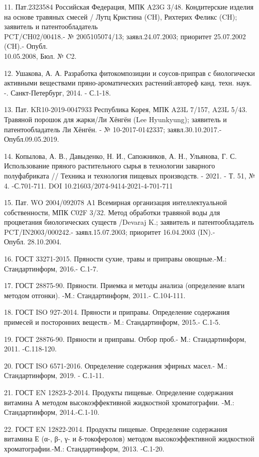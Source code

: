 \begin{references}
11. Пат.2323584 Российская Федерация, МПК A23G 3/48. Кондитерские
изделия на основе травяных смесей / Лутц Кристина (CH), Рихтерих Феликс
(CH); заявитель и патентообладатель \\PCT/CH02/00418.- № 2005105074/13;
заявл.24.07.2003; приоритет 25.07.2002 (CH).- Опубл. \\10.05.2008, Бюл. №
C2.

12. Ушакова, А. А. Разработка фитокомпозиции и соусов-приправ с
биологически активными веществами пряно-ароматических растений:автореф
канд. техн. наук. -. Санкт-Петербург, 2014. - С.1-18.

13. Пат. KR10-2019-0047933 Республика Корея, МПК A23L 7/157, A23L 5/43.
Травяной порошок для жарки/Ли Хёнгён (Lee Hyunkyung); заявитель и
патентообладатель Ли Хёнгён. - № 10-2017-0142337; заявл.30.10.2017.-
Опубл.09.05.2019.

14. Копылова, А. В., Давыденко, Н. И., Сапожников, А. Н., Ульянова, Г. С.
Использование пряного растительного сырья в технологии заварного
полуфабриката // Техника и технология пищевых производств. - 2021. - Т.
51, № 4. -С.701-711. DOI 10.21603/2074-9414-2021-4-701-711

15. Пат. WO 2004/092078 A1 Всемирная организация интеллектуальной
собственности, МПК C02F 3/32. Метод обработки травяной воды для
процветания биологических существ /Devaraj K.; заявитель и
патентообладатель PCT/IN2003/000242.- заявл.15.07.2003; приоритет
16.04.2003 (IN).- \\Опубл. 28.10.2004.

16. ГОСТ 33271-2015. Пряности сухие, травы и приправы овощные.-М.:
Стандартинформ, 2016.- С.1-7.

17. ГОСТ 28875-90. Пряности. Приемка и методы анализа (определение влаги
методом отгонки). -М.: Стандартинформ, 2011.- С.104-111.

18. ГОСТ ISO 927-2014. Пряности и приправы. Определение содержания
примесей и посторонних веществ.- М.: Стандартинформ, 2015.- С.1-5.

19. ГОСТ 28876-90. Пряности и приправы. Отбор проб.- М.: Стандартинформ,
2011. -С.118-120.

20. ГОСТ ISO 6571-2016. Определение содержания эфирных масел.- М.:
Стандартинформ, 2019. - С.1-11.

21. ГОСТ EN 12823-2-2014. Продукты пищевые. Определение содержания
витамина А методом высокоэффективной жидкостной хроматографии. -М.:
Стандартинформ, 2014.-С.1-10.

22. ГОСТ EN 12822-2014. Продукты пищевые. Определение содержания витамина
Е (α-, β-, γ- и δ-токоферолов) методом высокоэффективной жидкостной
хроматографии.-М.: Стандартинформ, 2013. -С.1-20.


\end{references}
